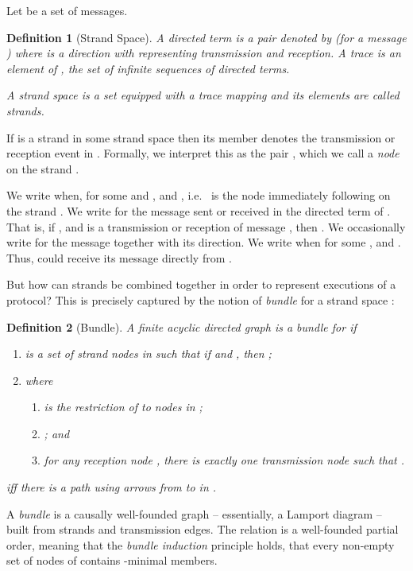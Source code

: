\documentclass[copyright]{eptcs}
\newcommand{\NI}{\noindent}
\newtheorem{definition}{Definition}
\begin{document}
Let  be a set of messages.
\begin{definition}[Strand Space]
  A {\em directed term} is a pair denoted by  (for  a
  message ) where  is a direction with 
  representing transmission and  reception.  A trace is an element
  of , the set of infinite sequences of directed terms.

  \NI A {\em strand space} is a set  equipped with a trace mapping
   and its elements are called {\em
    strands}.
\end{definition}
\NI If  is a strand in some strand space  then its
 member denotes the  transmission or
reception event in .  Formally, we interpret this as the pair
, which we call a \emph{node} on the strand .  

We write  when, for some  and ,  and
, i.e.~ is the node immediately following  on the
strand .  We write  for the message sent or received in the
directed term of .  That is, if , and  is a
transmission  or reception  of message , then .
We occasionally write  for the message together with
its direction.  We write  when for some ,  and .  Thus,  could receive its message directly
from .  

\smallskip

But how can strands be combined together in order to represent
executions of a protocol? This is precisely captured by the notion of
{\em bundle} for a strand space :
\begin{definition}[Bundle] 
A finite acyclic directed graph
   is a \emph{bundle}
  for  if
  \begin{enumerate}

  \item  is a set of strand nodes in  such that if
     and , then ;
    
  \item  where
  \begin{enumerate}
    \item  is the restriction of  to
    nodes in ;
    \item ; and
    \item for any reception node , there is exactly
    one transmission node  such that
    .
  \end{enumerate}

  \end{enumerate}
   iff there is a path using arrows
   from  to  in
  .
\end{definition}
A \emph{bundle} is a causally well-founded graph -- essentially, a
Lamport diagram -- built from strands and transmission edges.  The
relation  is a well-founded partial order, meaning
that the \emph{bundle induction} principle holds, that every non-empty
set of nodes of  contains -minimal members.
\end{document}
